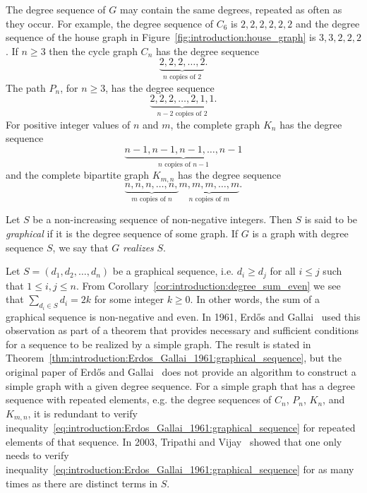 The degree sequence of $G$ may contain the same degrees, repeated as
often as they occur. For example, the degree sequence of $C_6$ is
$2, 2, 2, 2, 2, 2$ and the degree sequence of the house graph in
Figure~\ref{fig:introduction:house_graph} is $3, 3, 2, 2, 2$. If
$n \geq 3$ then the cycle graph $C_n$ has the degree sequence
\[
\underbrace{2, 2, 2, \dots, 2}_{n \text{ copies of } 2}.
\]
The path $P_n$, for $n \geq 3$, has the degree sequence
\[
\underbrace{2, 2, 2, \dots, 2, 1, 1}_{n - 2 \text{ copies of } 2}.
\]
For positive integer values of $n$ and $m$, the complete graph $K_n$
has the degree sequence
\[
\underbrace{n-1, n-1, n-1, \dots, n-1}_{n \text{ copies of } n-1}
\]
and the complete bipartite graph $K_{m,n}$ has the degree sequence
\[
\underbrace{n, n, n, \dots, n,}_{m \text{ copies of } n}
\underbrace{m, m, m, \dots, m}_{n \text{ copies of } m}.
\]

Let $S$ be a non-increasing sequence of non-negative integers. Then
$S$ is said to be \emph{graphical} if it is the degree sequence of
some graph. If $G$ is a graph with degree sequence $S$, we say that
$G$ \emph{realizes} $S$.


Let $S = (d_1, d_2, \dots, d_n)$ be a graphical sequence, i.e.
$d_i \geq d_j$ for all $i \leq j$ such that $1 \leq i, j \leq n$. From
Corollary~\ref{cor:introduction:degree_sum_even} we see that
$\sum_{d_i \in S} d_i = 2k$ for some integer $k \geq 0$. In other
words, the sum of a graphical sequence is non-negative and
even. In 1961, Erd\H{o}s and Gallai~\cite{ErdosGallai1960} used this
observation as part of a theorem that provides necessary and
sufficient conditions for a sequence to be realized by a simple
graph. The result is stated in
Theorem~\ref{thm:introduction:Erdos_Gallai_1961:graphical_sequence},
but the original paper of Erd\H{o}s and Gallai~\cite{ErdosGallai1960}
does not provide an algorithm to construct a simple graph with a given
degree sequence. For a simple graph that has a degree sequence with
repeated elements, e.g. the degree sequences of $C_n$, $P_n$, $K_n$,
and $K_{m,n}$, it is redundant to verify
inequality~\eqref{eq:introduction:Erdos_Gallai_1961:graphical_sequence}
for repeated elements of that sequence. In 2003, Tripathi and
Vijay~\cite{TripathiVijay2003} showed that one only needs to verify
inequality~\eqref{eq:introduction:Erdos_Gallai_1961:graphical_sequence}
for as many times as there are distinct terms in $S$.


